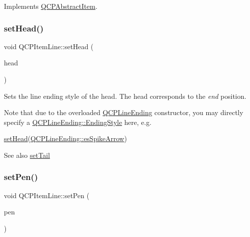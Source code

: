 Implements \hyperlink{class_q_c_p_abstract_item_ae41d0349d68bb802c49104afd100ba2a}{Q\+C\+P\+Abstract\+Item}.

\mbox{\label{class_q_c_p_item_line_aebf3d687114d584e0459db6759e2c3c3}} 
\subsubsection{\texorpdfstring{set\+Head()}{setHead()}}
{\footnotesize\ttfamily void Q\+C\+P\+Item\+Line\+::set\+Head (\begin{DoxyParamCaption}\item[{const \hyperlink{class_q_c_p_line_ending}{Q\+C\+P\+Line\+Ending} \&}]{head }\end{DoxyParamCaption})}

Sets the line ending style of the head. The head corresponds to the {\itshape end} position.

Note that due to the overloaded \hyperlink{class_q_c_p_line_ending}{Q\+C\+P\+Line\+Ending} constructor, you may directly specify a \hyperlink{class_q_c_p_line_ending_a5ef16e6876b4b74959c7261d8d4c2cd5}{Q\+C\+P\+Line\+Ending\+::\+Ending\+Style} here, e.\+g.
\begin{DoxyCode}
\hyperlink{class_q_c_p_item_line_aebf3d687114d584e0459db6759e2c3c3}{setHead}(\hyperlink{class_q_c_p_line_ending_a5ef16e6876b4b74959c7261d8d4c2cd5ab9964d0d03f812d1e79de15edbeb2cbf}{QCPLineEnding::esSpikeArrow}) 
\end{DoxyCode}


\begin{DoxySeeAlso}{See also}
\hyperlink{class_q_c_p_item_line_ac264222c3297a7efe33df9345c811a5f}{set\+Tail} 
\end{DoxySeeAlso}
\mbox{\label{class_q_c_p_item_line_a572528dab61c1abe205822fbd5db4b27}} 
\subsubsection{\texorpdfstring{set\+Pen()}{setPen()}}
{\footnotesize\ttfamily void Q\+C\+P\+Item\+Line\+::set\+Pen (\begin{DoxyParamCaption}\item[{const Q\+Pen \&}]{pen }\end{DoxyParamCaption})}

